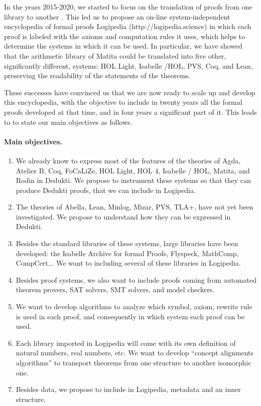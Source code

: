 In the years 2015-2020, we started to focus on the translation of
proofs from one library to another \cite{Dowek17,Thire18}. This led us
to propose an on-line system-independent encyclopedia of formal proofs
Logipedia (http://logipedia.science) in which each proof is labeled
with the axioms and computation rules it uses, which helps to
determine the systems in which it can be used. In particular, we have
showed that the arithmetic library of {\sc Matita} could be translated
into five other, significantly different, systems: {\sc HOL Light},
{\sc Isabelle /HOL}, {\sc PVS}, {\sc Coq}, and {\sc Lean}, preserving
the readability of the statements of the theorems.

These successes have convinced us that we are now ready to scale up
and develop this encyclopedia, with the objective to include in twenty
years all the formal proofs developed at that time, and in four years a
significant part of it. This leads to to state our main objectives as
follows.

\paragraph{Main objectives.}
\begin{enumerate}
\item 
  We already know to express most of the features of the theories of 
  {\sc Agda}, {\sc Atelier B}, {\sc Coq}, {\sc FoCaLiZe}, {\sc HOL Light},
  {\sc HOL 4}, {\sc Isabelle / HOL}, {\sc Matita}, and {\sc Rodin}
  in {\sc Dedukti}. We propose to instrument these systems so that
  they can produce {\sc Dedukti} proofs, that we can include in
  {\sc Logipedia}. 

\item
  The theories of {\sc Abella}, {\sc Lean}, {\sc Minlog}, {\sc Mizar},
  {\sc PVS}, {\sc TLA+}, have not yet been investigated. We propose to
  understand how they can be expressed in 
  {\sc Dedukti}. 

\item
  Besides the standard libraries of these systems, large libraries
  have been developed: the 
  Isabelle Archive for formal Proofs, Flyspeck, MathComp, CompCert...
We want to including several of these libraries in {\sc Logipedia}. 
  
\item
  Besides proof systems, we also want to include proofs coming from
  automated theorem provers, SAT solvers, SMT solvers, and model checkers. 

\item
  We want to develop algorithms to analyze which symbol, axiom, rewrite
  rule is used in each proof, and consequently in which system each proof
  can be used.

\item
  Each library imported in {\sc Logipedia} will come with its own
  definition of natural numbers, real numbers, etc. We want to develop
  ``concept alignments algorithms'' to transport theorems from one
  structure to another isomorphic one.

\item 
  Besides data, we propose to include in {\sc Logipedia}, metadata and
  an inner structure.
\end{enumerate}


